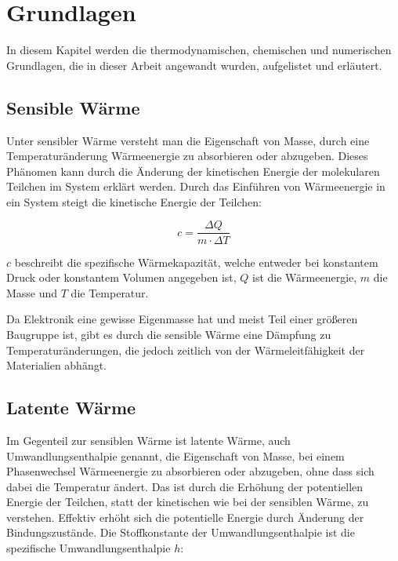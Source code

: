 \chapter{Grundlagen}
\label{chap:Grundlagen}			%

In diesem Kapitel werden die thermodynamischen, chemischen und numerischen Grundlagen, die in dieser Arbeit angewandt wurden, aufgelistet
und erläutert.

\section{Sensible Wärme}\label{sec:sensiblewaerme}
Unter sensibler Wärme versteht man die Eigenschaft von Masse, durch eine Temperaturänderung Wärmeenergie zu absorbieren oder abzugeben. Dieses
Phänomen kann durch die Änderung der kinetischen Energie der molekularen Teilchen im System erklärt werden. Durch das Einführen von
Wärmeenergie in ein System steigt die kinetische Energie der Teilchen:

\begin{equation}
    \label{eq:sensible_waerme}
    c = \frac{\Delta Q}{m \cdot \Delta T}
\end{equation}

$c$ beschreibt die spezifische Wärmekapazität, welche entweder bei konstantem Druck oder konstantem Volumen angegeben ist,
$Q$ ist die Wärmeenergie, $m$ die Masse und $T$ die Temperatur.

Da Elektronik eine gewisse Eigenmasse hat und meist Teil einer größeren Baugruppe ist, gibt es durch die sensible Wärme eine Dämpfung
zu Temperaturänderungen, die jedoch zeitlich von der Wärmeleitfähigkeit der Materialien abhängt.

\section{Latente Wärme}\label{sec:latentewaerme}

Im Gegenteil zur sensiblen Wärme ist latente Wärme, auch Umwandlungsenthalpie genannt, die Eigenschaft von Masse, bei einem Phasenwechsel Wärmeenergie
zu absorbieren oder abzugeben, ohne dass sich dabei die Temperatur ändert. Das ist durch die Erhöhung der potentiellen Energie der Teilchen,
statt der kinetischen wie bei der sensiblen Wärme, zu verstehen. Effektiv erhöht sich die potentielle Energie durch Änderung der Bindungszustände.
Die Stoffkonstante der Umwandlungsenthalpie ist die spezifische Umwandlungsenthalpie $h$:

